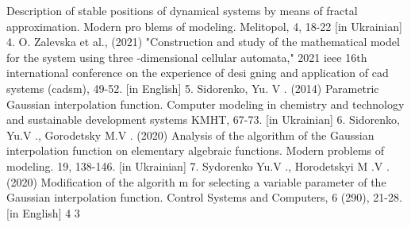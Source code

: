 \documentclass[12pt,a4paper]{article}
\begin{document}
Description of stable positions of dynamical systems by means of fractal approximation. Modern pro blems of modeling. Melitopol, 4, 18-22 [in Ukrainian] 4. O. Zalevska et al., (2021) "Construction and study of the mathematical model for the system using three -dimensional cellular automata," 2021 ieee 16th international conference on the experience of desi gning and application of cad systems (cadsm), 49-52. [in English] 5. Sidorenko, Yu. V . (2014) Parametric Gaussian interpolation function. Computer modeling in chemistry and technology and sustainable development systems KMHT, 67-73. [in Ukrainian] 6. Sidorenko, Yu.V ., Gorodetsky M.V . (2020) Analysis of the algorithm of the Gaussian interpolation function on elementary algebraic functions. Modern problems of modeling. 19, 138-146. [in Ukrainian] 7. Sydorenko Yu.V ., Horodetskyi M .V . (2020) Modification of the algorith m for selecting a variable parameter of the Gaussian interpolation function. Control Systems and Computers, 6 (290), 21-28. [in English] 4 3
\par
\end{document}
